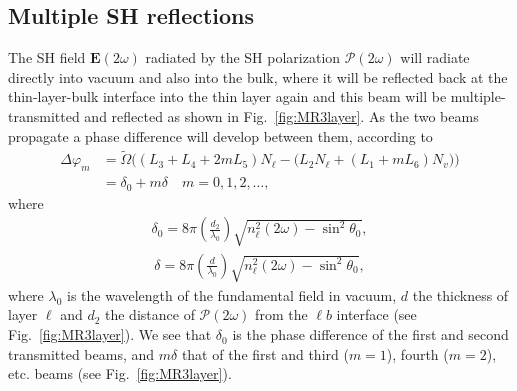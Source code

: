 \subsection{Multiple SH reflections}

The SH field $\mathbf{E}(2\omega)$ radiated by the SH polarization 
$\boldsymbol{\mathcal{P}}(2\omega)$
will radiate directly into vacuum and also into the bulk,
where it will be reflected back at the thin-layer-bulk interface into 
the thin layer again and this beam will be multiple-transmitted and 
reflected as shown in Fig.~\ref{fig:MR3layer}. 
As the two beams propagate a phase difference will develop between
them, according to
\begin{align}\label{m99}
\Delta\varphi_m&=\tilde\Omega\Big((L_{3} + L_{4} + 2mL_{5})N_{\ell}
-\big(L_{2}N_{\ell} + (L_{1} + mL_{6})N_{v}\big)
\Big)
\nonumber\\
&=\delta_{0} + m\delta\quad m=0,1,2,\ldots
,
\end{align}
where
\begin{align}\label{m97}
\delta_{0}=8\pi\left(\frac{d_2}{\lambda_0}\right)\sqrt{n^2_\ell(2\omega)-\sin^2\theta_{0}}
,
\end{align}
\begin{align}\label{m96}
\delta=8\pi\left(\frac{d}{\lambda_0}\right)\sqrt{n^2_\ell(2\omega)-\sin^2\theta_{0}}
,
\end{align}
where $\lambda_0$ is the wavelength of the fundamental field in
vacuum, $d$ the thickness of layer $\ell$ and $d_2$ the distance of
$\boldsymbol{\mathcal{P}}(2\omega)$  
from the $\ell b$ interface 
(see Fig.~\ref{fig:MR3layer}).
We see that
$\delta_{0}$ is the phase difference of 
the first and second transmitted beams, and $m\delta$ that of the first 
and  third ($m=1$), fourth ($m=2$), etc. beams (see 
Fig.~\ref{fig:MR3layer}). 

